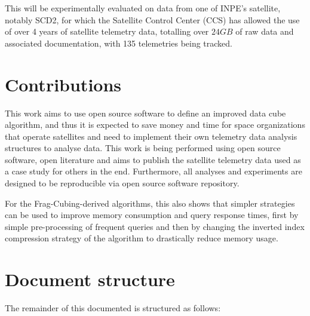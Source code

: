 This will be experimentally evaluated on data from one of INPE's satellite, notably SCD2, for which the Satellite Control Center (CCS) has allowed the use of over 4 years of satellite telemetry data, totalling over $24GB$ of raw data and associated documentation, with 135 telemetries being tracked.

\section{Contributions}\label{ch:intro:contrib}

This work aims to use open source software to define an improved data cube algorithm, and thus it is expected to save money and time for space organizations that operate satellites and need to implement their own telemetry data analysis structures to analyse data.
This work is being performed using open source software, open literature and aims to publish the satellite telemetry data used as a case study for others in the end.
Furthermore, all analyses and experiments are designed to be reproducible via open source software repository.

For the Frag-Cubing-derived algorithms, this also shows that simpler strategies can be used to improve memory consumption and query response times, first by simple pre-processing of frequent queries and then by changing the inverted index compression strategy of the algorithm to drastically reduce memory usage.

\section{Document structure}\label{ch:intro:org}

The remainder of this documented is structured as follows:

